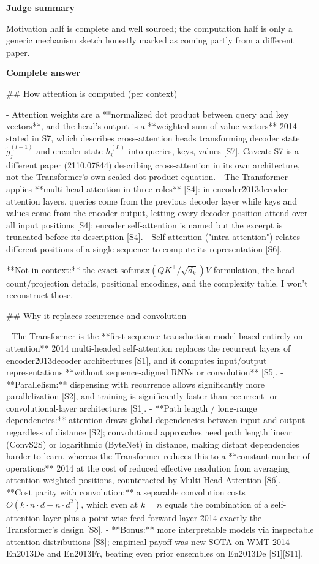 \documentclass[10pt]{article}
\begin{document}
\textbf{Judge summary}
\begin{EvidenceText}
Motivation half is complete and well sourced; the computation half is only a generic mechanism sketch honestly marked as coming partly from a different paper.
\end{EvidenceText}

\textbf{Complete answer}
\begin{AnswerText}
## How attention is computed (per context)

- Attention weights are a **normalized dot product between query and key vectors**, and the head's output is a **weighted sum of value vectors** \u2014 stated in S7, which describes cross-attention heads transforming decoder state $\tilde{g}_j^{(l-1)}$ and encoder state $h_i^{(L)}$ into queries, keys, values [S7]. Caveat: S7 is a different paper (2110.07844) describing cross-attention in its own architecture, not the Transformer's own scaled-dot-product equation.
- The Transformer applies **multi-head attention in three roles** [S4]: in encoder\u2013decoder attention layers, queries come from the previous decoder layer while keys and values come from the encoder output, letting every decoder position attend over all input positions [S4]; encoder self-attention is named but the excerpt is truncated before its description [S4].
- Self-attention ("intra-attention") relates different positions of a single sequence to compute its representation [S6].

**Not in context:** the exact $\mathrm{softmax}(QK^\top/\sqrt{d_k})V$ formulation, the head-count/projection details, positional encodings, and the complexity table. I won't reconstruct those.

## Why it replaces recurrence and convolution

- The Transformer is the **first sequence-transduction model based entirely on attention** \u2014 multi-headed self-attention replaces the recurrent layers of encoder\u2013decoder architectures [S1], and it computes input/output representations **without sequence-aligned RNNs or convolution** [S5].
- **Parallelism:** dispensing with recurrence allows significantly more parallelization [S2], and training is significantly faster than recurrent- or convolutional-layer architectures [S1].
- **Path length / long-range dependencies:** attention draws global dependencies between input and output regardless of distance [S2]; convolutional approaches need path length linear (ConvS2S) or logarithmic (ByteNet) in distance, making distant dependencies harder to learn, whereas the Transformer reduces this to a **constant number of operations** \u2014 at the cost of reduced effective resolution from averaging attention-weighted positions, counteracted by Multi-Head Attention [S6].
- **Cost parity with convolution:** a separable convolution costs $O(k\cdot n\cdot d + n\cdot d^2)$, which even at $k=n$ equals the combination of a self-attention layer plus a point-wise feed-forward layer \u2014 exactly the Transformer's design [S8].
- **Bonus:** more interpretable models via inspectable attention distributions [S8]; empirical payoff was new SOTA on WMT 2014 En\u2013De and En\u2013Fr, beating even prior ensembles on En\u2013De [S1][S11].


\end{AnswerText}
\end{document}

